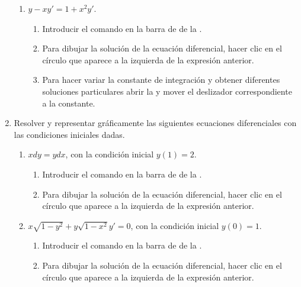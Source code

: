 \begin{enumerate}[leftmargin=*]
\begin{enumerate}
      \item $y-xy'=1+x^2y'$.
            \begin{indication}
            \begin{enumerate}
            \item Introducir el comando  en la barra de  de la .
            \item Para dibujar la solución de la ecuación diferencial, hacer clic en el círculo que aparece a la izquierda de la expresión anterior.
            \item Para hacer variar la constante de integración y obtener diferentes soluciones particulares abrir la  y mover el deslizador correspondiente a la constante.
            \end{enumerate}
            \end{indication}
      \end{enumerate}


\item Resolver y representar gráficamente las siguientes ecuaciones diferenciales con las condiciones iniciales dadas.
      \begin{enumerate}
      \item $xdy=ydx$, con la condición inicial $y(1)=2$.
            \begin{indication}
            \begin{enumerate}
            \item Introducir el comando  en la barra de  de la .
            \item Para dibujar la solución de la ecuación diferencial, hacer clic en el círculo que aparece a la izquierda de la expresión anterior.
            \end{enumerate}
            \end{indication}

      \item $x\sqrt{1-y^2}+y\sqrt{1-x^2} y'=0$, con la condición inicial $y(0)=1$.
            \begin{indication}
            \begin{enumerate}
            \item Introducir el comando  en la barra de  de la .
            \item Para dibujar la solución de la ecuación diferencial, hacer clic en el círculo que aparece a la izquierda de la expresión anterior.
            \end{enumerate}
            \end{indication}


\end{enumerate}
\end{enumerate}
